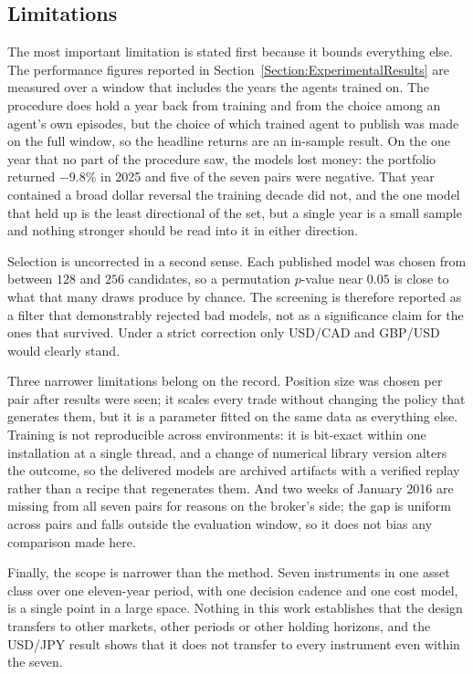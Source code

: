 \subsection{Limitations}
\label{Subsection:Limitations}

The most important limitation is stated first because it bounds everything else. The performance figures reported in Section~\ref{Section:ExperimentalResults} are measured over a window that includes the years the agents trained on. The procedure does hold a year back from training and from the choice among an agent's own episodes, but the choice of which trained agent to publish was made on the full window, so the headline returns are an in-sample result. On the one year that no part of the procedure saw, the models lost money: the portfolio returned $-9.8\%$ in 2025 and five of the seven pairs were negative. That year contained a broad dollar reversal the training decade did not, and the one model that held up is the least directional of the set, but a single year is a small sample and nothing stronger should be read into it in either direction.

Selection is uncorrected in a second sense. Each published model was chosen from between $128$ and $256$ candidates, so a permutation $p$-value near $0.05$ is close to what that many draws produce by chance. The screening is therefore reported as a filter that demonstrably rejected bad models, not as a significance claim for the ones that survived. Under a strict correction only USD/CAD and GBP/USD would clearly stand.

Three narrower limitations belong on the record. Position size was chosen per pair after results were seen; it scales every trade without changing the policy that generates them, but it is a parameter fitted on the same data as everything else. Training is not reproducible across environments: it is bit-exact within one installation at a single thread, and a change of numerical library version alters the outcome, so the delivered models are archived artifacts with a verified replay rather than a recipe that regenerates them. And two weeks of January 2016 are missing from all seven pairs for reasons on the broker's side; the gap is uniform across pairs and falls outside the evaluation window, so it does not bias any comparison made here.

Finally, the scope is narrower than the method. Seven instruments in one asset class over one eleven-year period, with one decision cadence and one cost model, is a single point in a large space. Nothing in this work establishes that the design transfers to other markets, other periods or other holding horizons, and the USD/JPY result shows that it does not transfer to every instrument even within the seven.